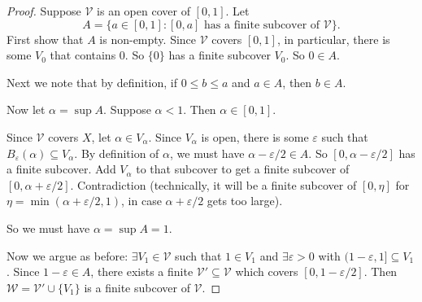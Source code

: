 \documentclass[a4paper]{article}
\begin{document}
\begin{proof}
  Suppose $\mathcal{V}$ is an open cover of $[0, 1]$. Let
  \[
    A = \{a\in [0, 1]: [0, a] \text{ has a finite subcover of }\mathcal{V}\}.
  \]
  First show that $A$ is non-empty. Since $\mathcal{V}$ covers $[0, 1]$, in particular, there is some $V_0$ that contains $0$. So $\{0\}$ has a finite subcover $V_0$. So $0\in A$.

  Next we note that by definition, if $0\leq b \leq a$ and $a\in A$, then $b\in A$.

  Now let $\alpha = \sup A$. Suppose $\alpha < 1$. Then $\alpha \in [0, 1]$.

  Since $\mathcal{V}$ covers $X$, let $\alpha \in V_\alpha$. Since $V_\alpha$ is open, there is some $\varepsilon$ such that $B_\varepsilon(\alpha) \subseteq V_\alpha$. By definition of $\alpha$, we must have $\alpha - \varepsilon/2\in A$. So $[0, \alpha - \varepsilon/2]$ has a finite subcover. Add $V_\alpha$ to that subcover to get a finite subcover of $[0, \alpha + \varepsilon/2]$. Contradiction (technically, it will be a finite subcover of $[0, \eta]$ for $\eta = \min(\alpha + \varepsilon/2, 1)$, in case $\alpha + \varepsilon/2$ gets too large).

  So we must have $\alpha = \sup A = 1$.

  Now we argue as before: $\exists V_1 \in \mathcal{V}$ such that $1 \in V_1$ and $\exists \varepsilon > 0$ with $(1 - \varepsilon, 1] \subseteq V_1$. Since $1 - \varepsilon \in A$, there exists a finite $\mathcal{V}' \subseteq \mathcal{V}$ which covers $[0, 1 - \varepsilon/2]$. Then $\mathcal{W} = \mathcal{V}' \cup \{V_1\}$ is a finite subcover of $\mathcal{V}$.
\end{proof}
\end{document}

